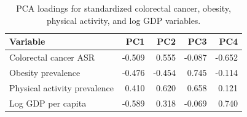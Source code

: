 \begin{table}
\centering
\caption{PCA loadings for standardized colorectal cancer, obesity, physical activity, and log GDP variables.}
\label{tab:pca_loadings}
\begin{tabular}{lrrrr}
\toprule
                    Variable &    PC1 &    PC2 &    PC3 &    PC4 \\
\midrule
       Colorectal cancer ASR & -0.509 &  0.555 & -0.087 & -0.652 \\
          Obesity prevalence & -0.476 & -0.454 &  0.745 & -0.114 \\
Physical activity prevalence &  0.410 &  0.620 &  0.658 &  0.121 \\
          Log GDP per capita & -0.589 &  0.318 & -0.069 &  0.740 \\
\bottomrule
\end{tabular}
\end{table}

